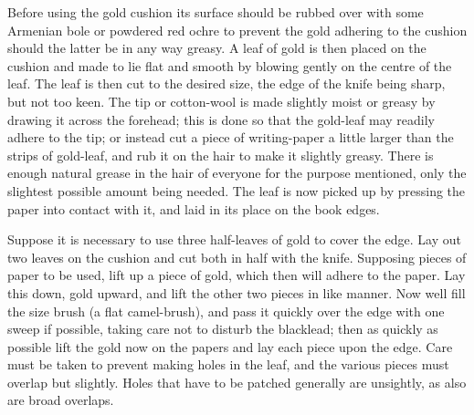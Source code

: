 \documentclass[twoside]{book}
\begin{document}
Before using the gold cushion its surface should
be rubbed over with some Armenian bole or
powdered red ochre to prevent the gold adhering
to the cushion should the latter be in any way
greasy. A leaf of gold is then placed on the
cushion and made to lie flat and smooth by blowing
gently on the centre of the leaf. The leaf is then
cut to the desired size, the edge of the knife being
sharp, but not too keen. The tip or cotton-wool is
made slightly moist or greasy by drawing it across
the forehead; this is done so that the gold-leaf may
readily adhere to the tip; or instead cut a piece
of writing-paper a little larger than the strips of
gold-leaf, and rub it on the hair to make it slightly
greasy. There is enough natural grease in the hair
of everyone for the purpose mentioned, only the
slightest possible amount being needed. The leaf
is now picked up by pressing the paper into contact
with it, and laid in its place on the book edges.

Suppose it is necessary to use three half-leaves
of gold to cover the edge. Lay out two leaves on
the cushion and cut both in half with the knife.
Supposing pieces of paper to be used, lift up a
piece of gold, which then will adhere to the paper.
Lay this down, gold upward, and lift the other two
pieces in like manner. Now well fill the size brush
(a flat camel-brush), and pass it quickly over the
edge with one sweep if possible, taking care not
to disturb the blacklead; then as quickly as
possible lift the gold now on the papers and lay
each piece upon the edge. Care must be taken to
prevent making holes in the leaf, and the various
pieces must overlap but slightly. Holes that have
to be patched generally are unsightly, as also are
broad overlaps.
\end{document}
